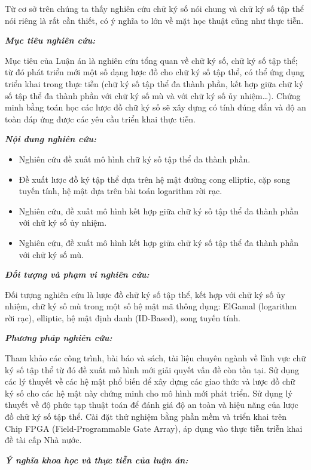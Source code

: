 Từ cơ sở trên chúng ta thấy nghiên cứu chữ ký số nói chung và chữ ký số tập thể nói riêng là rất cần thiết, có ý nghĩa to lớn về mặt học thuật cũng như thực tiễn.

\textit{\textbf{Mục tiêu nghiên cứu:}}

Mục tiêu của Luận án là nghiên cứu tổng quan về chữ ký số, chữ ký số tập thể; từ đó phát triển mới một số dạng lược đồ cho chữ ký số tập thể, có thể ứng dụng triển khai trong thực tiễn (chữ ký số tập thể đa thành phần, kết hợp giữa chữ ký số tập thể đa thành phần với chữ ký số mù và với chữ ký số ủy nhiệm\ldots). Chứng minh bằng toán học các lược đồ chữ ký số sẽ xây dựng có tính đúng đắn và độ an toàn đáp ứng được các yêu cầu triển khai thực tiễn.

\textit{\textbf{Nội dung nghiên cứu:}}
\begin{itemize}
	\item Nghiên cứu đề xuất mô hình chữ ký số tập thể đa thành phần.
	\item Đề xuất lược đồ ký tập thể dựa trên hệ mật đường cong elliptic, cặp song tuyến tính, hệ mật dựa trên bài toán logarithm rời rạc.
	\item Nghiên cứu, đề xuất mô hình kết hợp giữa chữ ký số tập thể đa thành phần với chữ ký số ủy nhiệm.
	\item Nghiên cứu, đề xuất mô hình kết hợp giữa chữ ký số tập thể đa thành phần với chữ ký số mù.
\end{itemize}

\textit{\textbf{Đối tượng và phạm vi nghiên cứu:}}

Đối tượng nghiên cứu là lược đồ chữ ký số tập thể, kết hợp với chữ ký số ủy nhiệm, chữ ký số mù trong một số hệ mật mã thông dụng: ElGamal (logarithm rời rạc), elliptic, hệ mật định danh (ID-Based), song tuyến tính.


\textit{\textbf{Phương pháp nghiên cứu:}}

Tham khảo các công trình, bài báo và sách, tài liệu chuyên ngành về lĩnh vực chữ ký số tập thể từ đó đề xuất mô hình mới giải quyết vấn đề còn tồn tại. Sử dụng các lý thuyết về các hệ mật phổ biến để xây dựng các giao thức và lược đồ chữ ký số cho các hệ mật này chứng minh cho mô hình mới phát triển. Sử dụng lý thuyết về độ phức tạp thuật toán để đánh giá độ an toàn và hiệu năng của lược đồ chữ ký số tập thể. Cài đặt thử nghiệm bằng phần mềm và triển khai trên Chip FPGA (Field-Programmable Gate Array), áp dụng vào thực tiễn triễn khai đề tài cấp Nhà nước.

\textit{\textbf{Ý nghĩa khoa học và thực tiễn của luận án:}}

